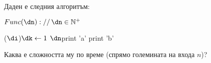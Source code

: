\begin{problem}
	Даден е следния алгоритъм:
	\begin{pseudocode}
		
		$Func(\dn)://\,\dn\in\mathbb{N}^+$
		\Mybegin
		{
			{
				{
					\If{$\dj<\dn$}
					{
						\Myfor(\Withstep $\di$){$\dk\leftarrow1$ \KwTo $\dn$}{print 'a'\;}
					}
					print 'b'\;
				}
				
				
				
			}
		}
	\end{pseudocode}
	Каква е сложността му по време (спрямо големината на входа $n$)?
\end{problem}

